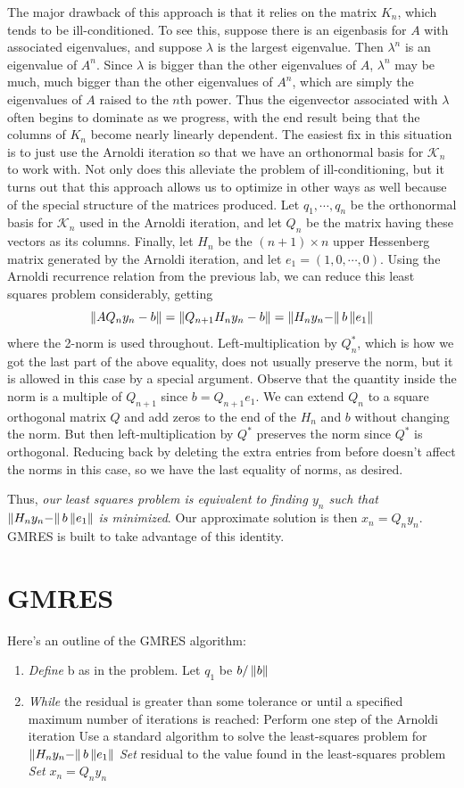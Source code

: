 The major drawback of this approach is that it relies on the matrix $K_n$, which tends to be ill-conditioned.
To see this, suppose there is an eigenbasis for $A$ with associated eigenvalues, and suppose $\lambda$ is the largest eigenvalue.
Then $\lambda^n$ is an eigenvalue of $A^n$.
Since $\lambda$ is bigger than the other eigenvalues of $A$, $\lambda^n$ may be much, much bigger than the other eigenvalues of $A^n$, which are simply the eigenvalues of $A$ raised to the $n$th power.
Thus the eigenvector associated with $\lambda$ often begins to dominate as we progress, with the end result being that the columns of $K_n$ become nearly linearly dependent.
The easiest fix in this situation is to just use the Arnoldi iteration so that we have an orthonormal basis for $\mathcal{K}_n$ to work with.
Not only does this alleviate the problem of ill-conditioning, but it turns out that this approach allows us to optimize in other ways as well because of the special structure of the matrices produced.
Let $q_1,\cdots, q_n$ be the orthonormal basis for $\mathcal{K}_n$ used in the Arnoldi iteration, and let $Q_n$ be the matrix having these vectors as its columns.
Finally, let $H_n$ be the $(n+1)\times n$ upper Hessenberg matrix generated by the Arnoldi iteration, and let $e_1=(1,0,\cdots,0)$.
Using the Arnoldi recurrence relation from the previous lab, we can reduce this least squares problem considerably, getting
\[\left\lVert AQ_n y_n-b\right\rVert=\left\lVert Q_{n+1}H_{n}y_n-b\right\rVert=\left\lVert H_ny_n-\right\rVert b \left\lVert e_1\right\rVert\]
where the 2-norm is used throughout.
Left-multiplication by $Q_{n}^{*}$, which is how we got the last part of the above equality, does not usually preserve the norm, but it is allowed in this case by a special argument.
Observe that the quantity inside the norm is a multiple of $Q_{n+1}$ since $b=Q_{n+1}e_1$.
We can extend $Q_n$ to a square orthogonal matrix $Q$ and add zeros to the end of the $H_n$ and $b$ without changing the norm.
But then left-multiplication by $Q^*$ preserves the norm since $Q^*$ is orthogonal.
Reducing back by deleting the extra entries from before doesn't affect the norms in this case, so we have the last equality of norms, as desired.

Thus, \emph{our least squares problem is equivalent to finding $y_n$ such that $\left\lVert H_ny_n-\right\rVert b \left\lVert e_1\right\rVert$ is minimized}.
Our approximate solution is then $x_n=Q_n y_n$. GMRES is built to take advantage of this identity.

\section*{GMRES}
Here's an outline of the GMRES algorithm:
\begin{enumerate}
\item \emph{Define} b as in the problem. Let $q_1$ be $b/\left\lVert b\right\rVert$
\item \emph{While} the residual is greater than some tolerance or until a specified maximum number of 
iterations is reached:
\subitem Perform one step of the Arnoldi iteration
\subitem Use a standard algorithm to solve the least-squares problem for $\left\lVert H_ny_n-\right\rVert b \left\lVert e_1\right\rVert$
\subitem \emph{Set} residual to the value found in the least-squares problem
\subitem \emph{Set} $x_n=Q_n y_n$
\end{enumerate}

